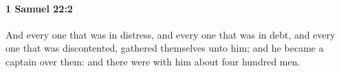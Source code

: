 
		\paragraph{1 Samuel 22:2} %
			\label{1SAMUEL-22-2}

			And every one that was in distress, and every one that was in debt, and every one that was discontented, gathered themselves unto him; and he became a captain over them: and there were with him about four hundred men.


